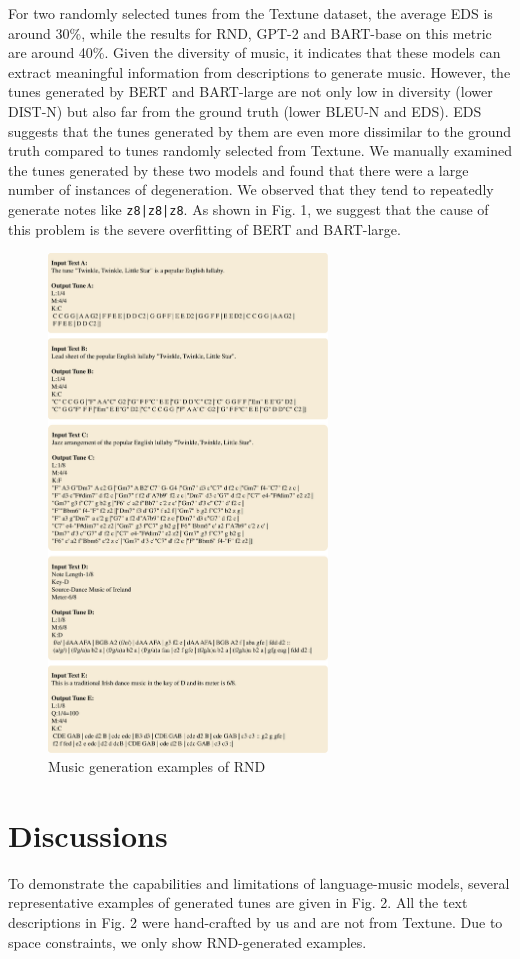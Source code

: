 \documentclass[letterpaper]{article} %
\begin{document}
For two randomly selected tunes from the Textune dataset, the average EDS is around 30\%, while the results for RND, GPT-2 and BART-base on this metric are around 40\%. Given the diversity of music, it indicates that these models can extract meaningful information from descriptions to generate music. However, the tunes generated by BERT and BART-large are not only low in diversity (lower DIST-N) but also far from the ground truth (lower BLEU-N and EDS). EDS suggests that the tunes generated by them are even more dissimilar to the ground truth compared to tunes randomly selected from Textune. We manually examined the tunes generated by these two models and found that there were a large number of instances of degeneration. We observed that they tend to repeatedly generate notes like \texttt{z8|z8|z8}. As shown in Fig. 1, we suggest that the cause of this problem is the severe overfitting of BERT and BART-large.

\begin{figure}[t]
\centering
\begin{minipage}{8.25cm}
\includegraphics[width=\textwidth,height=5.202in ]{fig2.pdf}
\end{minipage}
\centering
\caption{Music generation examples of RND}
\end{figure}
\section{Discussions}
\vspace{-1.86mm}
To demonstrate the capabilities and limitations of language-music models, several representative examples of generated tunes are given in Fig. 2. All the text descriptions in Fig. 2 were hand-crafted by us and are not from Textune. Due to space constraints, we only show RND-generated examples.
\end{document}
